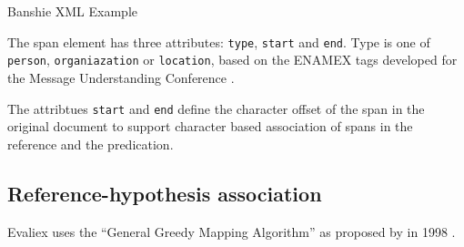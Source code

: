 \begin{listing}[H]
\inputminted{xml}{../../../../../banshie-api/src/main/resources/example.xml}
\caption{Banshie XML Example}
\label{lst:xml-example}
\end{listing}

The span element has three attributes: \texttt{type}, \texttt{start} and \texttt{end}. Type is one of \texttt{person}, \texttt{organiazation} or \texttt{location}, based on the ENAMEX tags developed for the Message Understanding Conference \cite{Grishman:1996}.

The attribtues \texttt{start} and \texttt{end} define the character offset of the span in the original document to support character based association of spans in the reference and the predication.

\subsection{Reference-hypothesis association}
Evaliex \cite{Linsmayr:2010} uses the \enquote{General Greedy Mapping Algorithm} as proposed by \citeauthor{Douthat:1998} in 1998 \cite{Douthat:1998}. 

